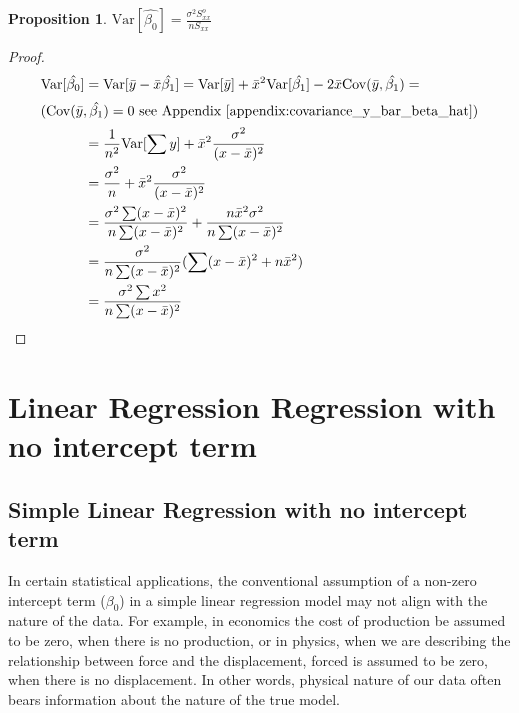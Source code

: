 \documentclass[12pt,a4paper,oneside]{book} %
\newtheorem{proposition}[theorem]{Proposition}
\newcommand{\Var}{\mathrm{Var}}
\newcommand{\Cov}{\mathrm{Cov}}
\begin{document}
\begin{proposition}
	$\Var [\hat{\beta_0}]= \frac{\sigma^2 S_{xx}^o}{n S_{xx}} $
\end{proposition}



\begin{proof}
	\begin{align*}
		\Var [\hat{\beta_0}] &= \Var [\bar{y}- \bar{x}\hat{\beta_1}] = \Var [\bar{y}] + \bar{x}^2 \Var [\hat{\beta_1}]- 2\bar{x} \Cov (\bar{y}, \hat{\beta_1}) = \\ 
		\intertext{($\Cov (\bar{y}, \hat{\beta_1})=0$ see Appendix \ref{appendix:covariance_y_bar_beta_hat})}
		&= \frac{1}{n^2}\Var [\sum y] + \bar{x}^2 \frac{\sigma^2}{(x-\bar{x})^2} \\
		&= \frac{\sigma^2}{n}+\bar{x}^2 \frac{\sigma^2}{(x-\bar{x})^2} \\
		&= \frac{\sigma^2 \sum (x-\bar{x})^2}{n \sum (x-\bar{x})^2}+\frac{n \bar{x}^2 \sigma^2}{n \sum (x- \bar{x})^2} \\
		&= \frac{\sigma^2 }{n \sum (x-\bar{x})^2} (\sum (x-\bar{x})^2+n\bar{x}^2) \\
		&= \frac{\sigma^2 \sum x^2}{n \sum (x-\bar{x})^2}
	\end{align*}
\end{proof}

	\clearpage





\chapter{Linear Regression Regression with no intercept term}

	\section{Simple Linear Regression with no intercept term}

	In certain statistical applications, the conventional assumption of a non-zero intercept term ($\beta_0$) in a simple linear regression model may not align with the nature of the data. For example, in economics the cost of production be assumed to be zero, when there is no production, or in physics, when we are describing the relationship between force and the displacement, forced is assumed to be zero, when there is no displacement. In other words, physical nature of our data often bears information about the nature of the true model. 
	
\end{document}

